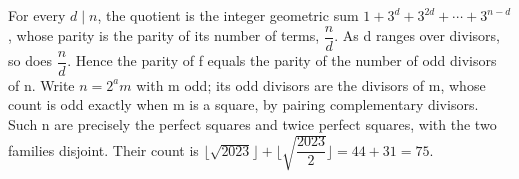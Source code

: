 For every $d\mid n$, the quotient is the integer geometric sum $1+3^d+3^{2 d}+\cdots+3^{n-d}$, whose parity is the parity of its number of terms, $\dfrac{n}{d}$. As d ranges over divisors, so does $\dfrac{n}{d}$. Hence the parity of f equals the parity of the number of odd divisors of n. Write $n=2^a m$ with m odd; its odd divisors are the divisors of m, whose count is odd exactly when m is a square, by pairing complementary divisors. Such n are precisely the perfect squares and twice perfect squares, with the two families disjoint. Their count is $\lfloor\sqrt{2023}\rfloor+\lfloor\sqrt{\dfrac{2023}{2}}\rfloor=44+31=\boxed{75}$.
